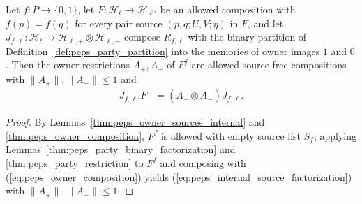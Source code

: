 \begin{lemma}
    \label{thm:peps_internal_source_factorization}
    \leanok
    Let $f:P\to\{0,1\}$, let $F:\mathcal H_\ell\to\mathcal H_{\ell'}$ be an
    allowed composition with $f(p)=f(q)$ for every pair source $(p,q;U,V;\eta)$
    in $F$, and let
    $J_{f,\ell}:\mathcal H_\ell\to\mathcal H_{\ell,+}\otimes\mathcal H_{\ell,-}$
    compose $R_{f,\ell}$ with the binary partition of
    Definition~\ref{def:peps_party_partition} into the memories of owner images
    $1$ and $0$. Then the owner restrictions $A_+,A_-$ of $F^f$ are allowed
    source-free compositions with $\|A_+\|,\|A_-\|\le1$ and
    \begin{align}
        J_{f,\ell'}F
         & =(A_+\otimes A_-)J_{f,\ell}.
        \label{eq:peps_internal_source_factorization}
    \end{align}
\end{lemma}

\begin{proof}\leanok
    By Lemmas~\ref{thm:peps_owner_sources_internal} and
    \ref{thm:peps_owner_composition}, $F^f$ is allowed with empty source list
    $S_f$; applying Lemmas~\ref{thm:peps_party_binary_factorization} and
    \ref{thm:peps_party_restriction} to $F^f$ and composing with
    (\ref{eq:peps_owner_composition}) yields
    (\ref{eq:peps_internal_source_factorization}) with $\|A_+\|,\|A_-\|\le1$.
\end{proof}
